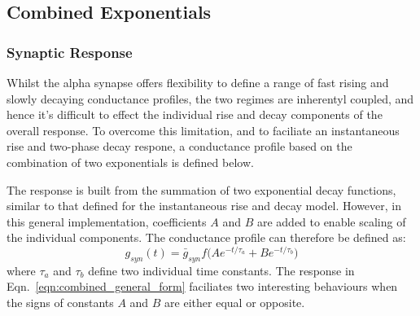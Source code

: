\documentclass[12pt]{article}
\begin{document}
\subsection{Combined Exponentials}
\subsubsection*{Synaptic Response}
Whilst the alpha synapse offers flexibility to define a range of fast rising and
slowly decaying conductance profiles, the two regimes are inherentyl coupled,
and hence it's difficult to effect the individual rise and decay components of
the overall response. To overcome this limitation, and to faciliate
an instantaneous rise and two-phase decay respone, a conductance profile based
on the combination of two exponentials is defined below.

The response is built from the summation of two exponential decay functions,
similar to that defined for the instantaneous rise and decay model. However, in
this general implementation, coefficients $A$ and $B$ are added to enable
scaling of the individual components. The conductance profile can therefore be
defined as:
\begin{equation}
g_{syn}(t)=\bar{g}_{syn}f\Big(Ae^{-t / \tau_a} + Be^{-t / \tau_b}\Big)
\label{eqn:combined_general_form}
\end{equation}
where $\tau_a$ and $\tau_b$ define two individual time constants. The response
in Eqn.~\ref{eqn:combined_general_form} faciliates two interesting behaviours
when the signs of constants $A$ and $B$ are either equal or opposite.
\end{document}
